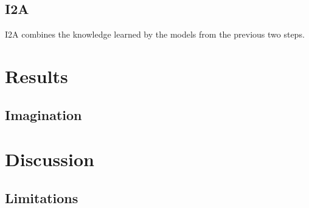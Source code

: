 \documentclass[10pt, twocolumn]{article}
\begin{document}
\subsection{I2A}

I2A combines the knowledge learned by the models from the previous two steps.

\section{Results}

\subsection{Imagination}

\section{Discussion}

\subsection{Limitations}
\end{document}

